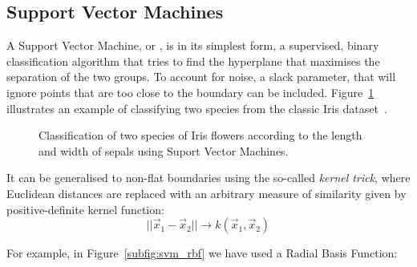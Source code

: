 \subsection{Support Vector Machines}
A Support Vector Machine, or \SVM, is in its simplest form, a supervised, binary classification algorithm that tries to find the hyperplane that maximises the separation of the two groups.
To account for noise, a slack parameter, that will ignore points that are too close to the boundary can be included.
Figure~\ref{fig:svm} illustrates an example of classifying two species from the classic Iris dataset~\citep{iris_dataset}.


\begin{figure}
\centering
{}%
\hfill
{}%
\caption{Classification of two species of Iris flowers according to the length and width of sepals using Suport Vector Machines.}\label{fig:svm}
\end{figure}

It can be generalised  to non-flat boundaries using the so-called \emph{kernel trick}, where Euclidean distances are replaced with an arbitrary measure of similarity given by positive-definite kernel function:
\[||\vec{x}_1 - \vec{x}_2|| \rightarrow k(\vec{x}_1, \vec{x}_2)\]

For example, in Figure~\ref{subfig:svm_rbf} we have used a Radial Basis Function:

